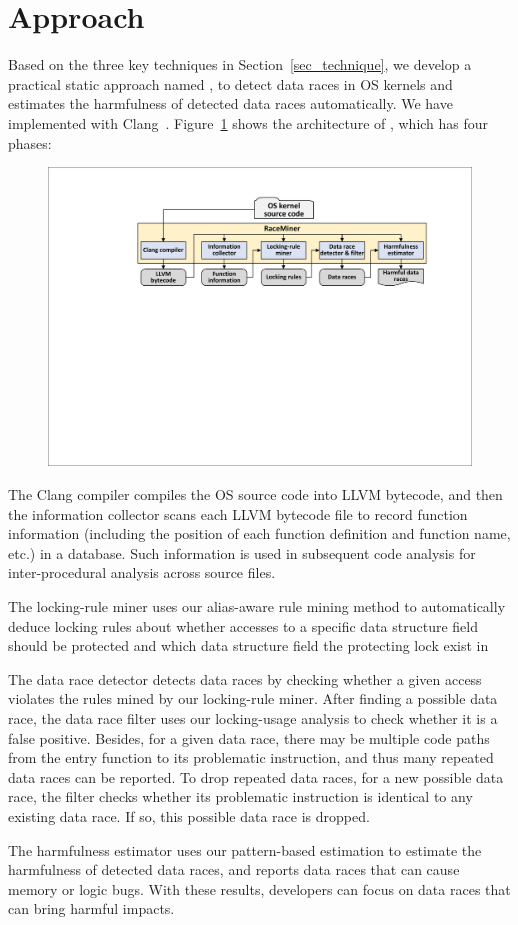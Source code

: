 \section{\sys Approach}
\label{sec_framework}

Based on the three key techniques in Section~\ref{sec_technique}, we develop a 
practical static approach named \sys, to detect data races in OS kernels and 
estimates the harmfulness of detected data races automatically. We have 
implemented \sys with Clang~\cite{clang}. Figure~\ref{fig_architecture} shows 
the architecture of \sys, which has four phases:

\begin{figure}[htbp]
	\centering
	\includegraphics[width=1\linewidth]{figures/fig_architecture.pdf}
	\label{fig_architecture}
\end{figure}

 The Clang compiler compiles the OS source 
code into LLVM bytecode, and then the information collector scans each LLVM 
bytecode file to record function information (including the position of each 
function definition and function name, etc.) in a database. Such information is 
used in subsequent code analysis for inter-procedural analysis across source 
files.

 The locking-rule miner uses our alias-aware rule 
mining method to automatically deduce locking rules about whether accesses to a 
specific data structure field should be protected and which data structure 
field the protecting lock exist in

 The data race 
detector detects data races by checking whether a given access violates the 
rules mined by our locking-rule miner. After finding a possible data race, the 
data race filter uses our locking-usage analysis to check whether it is a 
false positive. Besides, for a given data race, there may be multiple code 
paths from the entry function to its problematic instruction, and thus many 
repeated data races can be reported. To drop repeated data races, for a new 
possible data race, the filter checks whether its problematic 
instruction is identical to any existing data race. If so, this possible data 
race is dropped.

 The harmfulness estimator uses our 
pattern-based estimation to estimate the harmfulness of detected data races, 
and reports data races that can cause memory or logic bugs. With these results, 
developers can focus on data races that can bring harmful impacts.